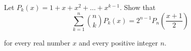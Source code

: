 Let $P_k(x)=1+x+x^2+\ldots +x^{k-1}$. Show that\[ \sum_{k=1}^n \binom{n}{k} P_k(x)=2^{n-1} P_n \left( \frac{x+1}{2} \right) \]

for every real number $x$ and every positive integer $n$.